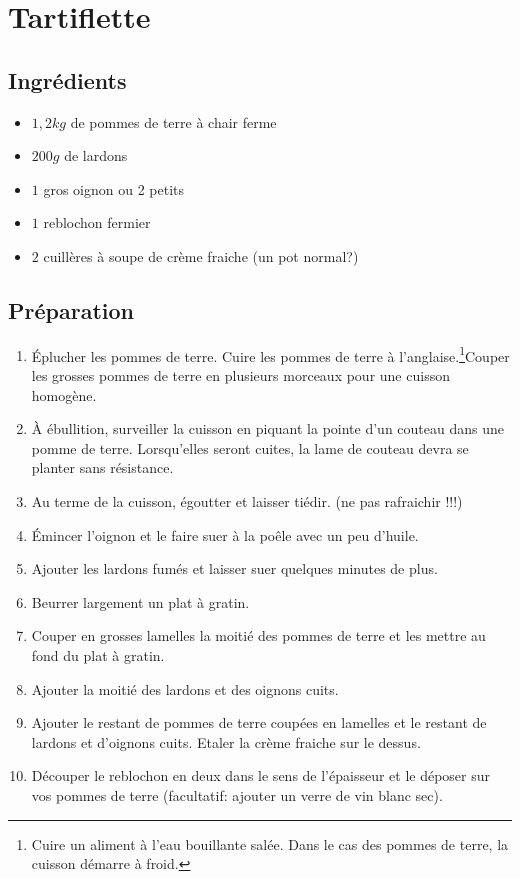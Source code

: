 \newpage
\section{Tartiflette}
\subsection*{Ingrédients}
\begin{itemize}
\item $1,2\unit{kg}$ de pommes de terre à chair ferme
\item $200\unit{g}$ de lardons
\item $1$ gros oignon ou 2 petits
\item $1$ reblochon fermier
\item $2$ cuillères à soupe de crème fraiche (un pot normal?)
\end{itemize}
\subsection*{Préparation}
\begin{enumerate}
\item Éplucher les pommes de terre. Cuire les pommes de terre à l'anglaise.\footnote{Cuire un aliment à l'eau bouillante salée. Dans le cas des pommes de terre, la cuisson démarre à froid.}Couper les grosses pommes de terre en plusieurs morceaux pour une cuisson homogène.
\item À ébullition, surveiller la cuisson en piquant la pointe d'un couteau dans une pomme de terre. Lorsqu'elles seront cuites, la lame de couteau devra se planter sans résistance.
\item Au terme de la cuisson, égoutter et laisser tiédir. (ne pas rafraichir !!!)
\item Émincer l'oignon et le faire suer à la poêle avec un peu d'huile.
\item Ajouter les lardons fumés et laisser suer quelques minutes de plus.
\item Beurrer largement un plat à gratin.
\item Couper en grosses lamelles la moitié des pommes de terre et les mettre au fond du plat à gratin.
\item Ajouter la moitié des lardons et des oignons cuits.
\item Ajouter le restant de pommes de terre coupées en lamelles et le restant de lardons et d'oignons cuits. Etaler la crème fraiche sur le dessus.
\item Découper le reblochon en deux dans le sens de l'épaisseur et le déposer sur vos pommes de terre (facultatif: ajouter un verre de vin blanc sec).

\end{enumerate}

